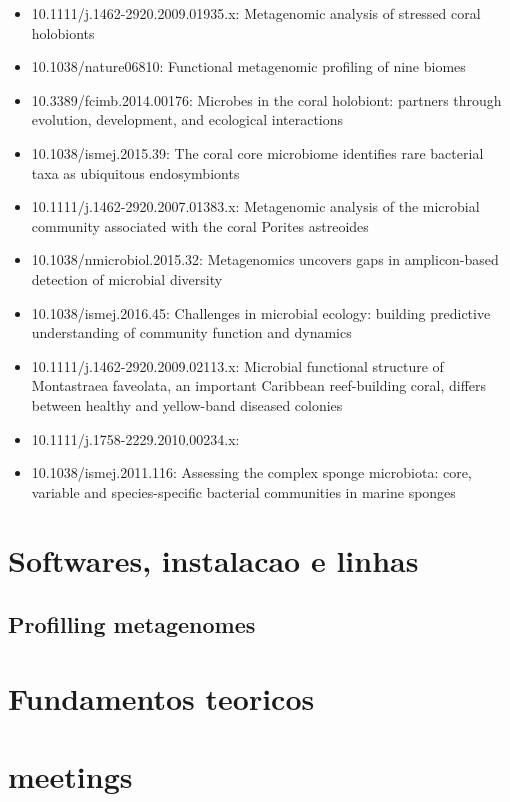 \documentclass[12pt, a4paper]{report}
\begin{document}
\begin{itemize}
\item 10.1111/j.1462-2920.2009.01935.x: Metagenomic analysis of stressed coral holobionts
\item 10.1038/nature06810: Functional metagenomic profiling of nine biomes
\item 10.3389/fcimb.2014.00176: Microbes in the coral holobiont: partners through evolution, development, and ecological interactions
\item 10.1038/ismej.2015.39: The coral core microbiome identifies rare bacterial
taxa as ubiquitous endosymbionts
\item 10.1111/j.1462-2920.2007.01383.x: Metagenomic analysis of the microbial community
associated with the coral Porites astreoides
\item  10.1038/nmicrobiol.2015.32: Metagenomics uncovers gaps in amplicon-based
detection of microbial diversity
\item 10.1038/ismej.2016.45: Challenges in microbial ecology: building predictive
understanding of community function and dynamics
\item 10.1111/j.1462-2920.2009.02113.x: Microbial functional structure of Montastraea faveolata,
an important Caribbean reef-building coral, differs
between healthy and yellow-band diseased colonies
\item 10.1111/j.1758-2229.2010.00234.x: 
\item 10.1038/ismej.2011.116: Assessing the complex sponge microbiota: core, variable and species-specific bacterial communities
in marine sponges
\end{itemize}

\chapter{Softwares, instalacao e linhas}

\section{Profilling metagenomes}

\chapter{Fundamentos teoricos}


\chapter{meetings}
\end{document}
